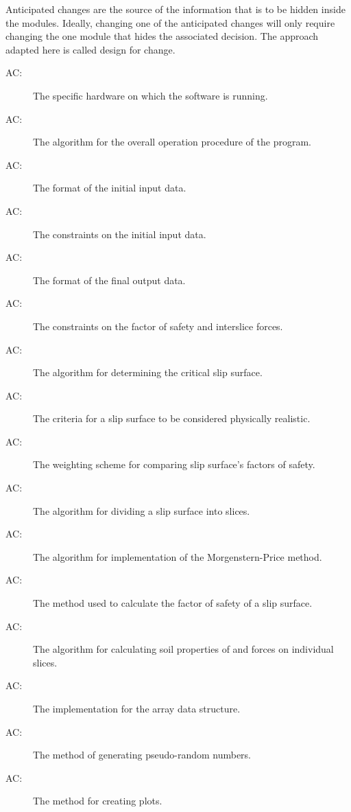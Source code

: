 \documentclass[12pt, titlepage]{article}
\newcounter{acnum}
\begin{document}
\hspace{3ex}Anticipated changes are the source of the information that
is to be hidden inside the modules. Ideally, changing one of the
anticipated changes will only require changing the one module that
hides the associated decision. The approach adapted here is called
design for change.

\begin{description}
\item[AC\theacnum \label{AC_hardware}:] The
  specific hardware on which the software is running.
\item[AC\theacnum \label{AC_Control}:] The
  algorithm for the overall operation procedure of the program.
\item[AC\theacnum \label{AC_input}:] The format
  of the initial input data.
\item[AC\theacnum \label{AC_inputConstraints}:] The       
constraints on the initial input data.
\item[AC\theacnum \label{AC_output}:] The format
  of the final output data.
\item[AC\theacnum \label{AC_outputConstraints}:] The     
constraints on the factor of safety and interslice forces.
\item[AC\theacnum \label{AC_GenAlg}:] The algorithm
  for determining the critical slip surface.
\item[AC\theacnum \label{AC_Kin}:] The criteria for
  a slip surface to be considered physically realistic.
\item[AC\theacnum \label{AC_FSweight}:] The
  weighting scheme for comparing slip surface's factors of safety.
\item[AC\theacnum \label{AC_Slicer}:] The
  algorithm for dividing a slip surface into slices.
\item[AC\theacnum \label{AC_MP}:] The
  algorithm for implementation of the Morgenstern-Price method.
\item[AC\theacnum \label{AC_CalcFS}:] The method used to 
  calculate the factor of safety of a slip surface.
\item[AC\theacnum \label{AC_PropSorter}:] The
  algorithm for calculating soil properties of and forces on individual slices.
\item[AC\theacnum \label{AC_Array}:] The
  implementation for the array data structure.
\item[AC\theacnum \label{AC_Rand}:] The method
  of generating pseudo-random numbers.
\newline{}
\item[AC\theacnum \label{AC_Plot}:] The method
  for creating plots.
\end{description}
\end{document}
